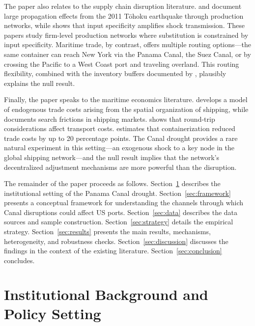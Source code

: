 \documentclass[12pt]{article}
\begin{document}
The paper also relates to the supply chain disruption literature. \citet{boehm2019input} and \citet{carvalho2021supply} document large propagation effects from the 2011 T\={o}hoku earthquake through production networks, while \citet{barrot2016input} shows that input specificity amplifies shock transmission. These papers study firm-level production networks where substitution is constrained by input specificity. Maritime trade, by contrast, offers multiple routing options---the same container can reach New York via the Panama Canal, the Suez Canal, or by crossing the Pacific to a West Coast port and traveling overland. This routing flexibility, combined with the inventory buffers documented by \citet{alessandria2010inventories}, plausibly explains the null result.

Finally, the paper speaks to the maritime economics literature. \citet{brancaccio2020geography} develops a model of endogenous trade costs arising from the spatial organization of shipping, while \citet{brancaccio2023search} documents search frictions in shipping markets. \citet{wong2022ships} shows that round-trip considerations affect transport costs. \citet{cosar2022shipping} estimates that containerization reduced trade costs by up to 20 percentage points. The Canal drought provides a rare natural experiment in this setting---an exogenous shock to a key node in the global shipping network---and the null result implies that the network's decentralized adjustment mechanisms are more powerful than the disruption.

The remainder of the paper proceeds as follows. Section~\ref{sec:background} describes the institutional setting of the Panama Canal drought. Section~\ref{sec:framework} presents a conceptual framework for understanding the channels through which Canal disruptions could affect US ports. Section~\ref{sec:data} describes the data sources and sample construction. Section~\ref{sec:strategy} details the empirical strategy. Section~\ref{sec:results} presents the main results, mechanisms, heterogeneity, and robustness checks. Section~\ref{sec:discussion} discusses the findings in the context of the existing literature. Section~\ref{sec:conclusion} concludes.


\section{Institutional Background and Policy Setting}
\label{sec:background}
\end{document}
